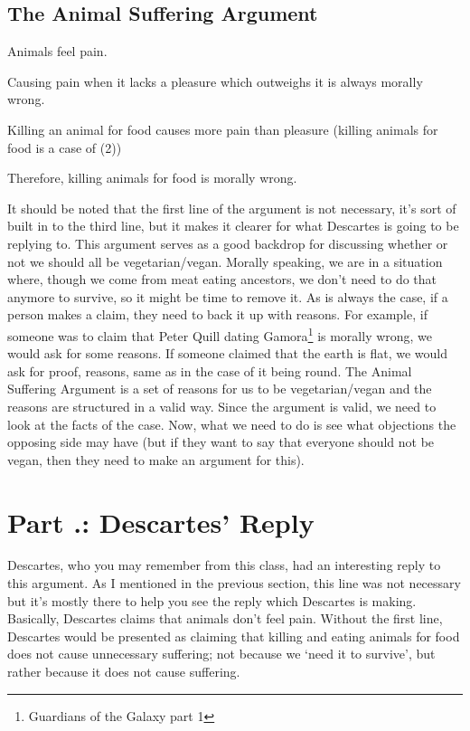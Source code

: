 \subsection{The Animal Suffering Argument} 
\begin{earg}
    \item[1] Animals feel pain.
    \item[2] Causing pain when it lacks a pleasure which outweighs it is always morally wrong.
    \item[3] Killing an animal for food causes more pain than pleasure (killing animals for food is a case of (2))
    \item[4] Therefore, killing animals for food is morally wrong.
\end{earg}

It should be noted that the first line of the argument is not necessary, it's sort of built in to the third line, but it makes it clearer for what Descartes is going to be replying to. This argument serves as a good backdrop for discussing whether or not we should all be vegetarian/vegan. Morally speaking, we are in a situation where, though we come from meat eating ancestors, we don't need to do that anymore to survive, so it might be time to remove it.  As is always the case, if a person makes a claim, they need to back it up with reasons. For example, if someone was to claim that Peter Quill dating Gamora\footnote{Guardians of the Galaxy part 1} is morally wrong, we would ask for some reasons. If someone claimed that the earth is flat, we would ask for proof, reasons, same as in the case of it being round.  The Animal Suffering Argument is a set of reasons for us to be vegetarian/vegan and the reasons are structured in a valid way. Since the argument is valid, we need to look at the facts of the case. Now, what we need to do is see what objections the opposing side may have (but if they want to say that everyone should not be vegan, then they need to make an argument for this).

\section{Part \thechapcount.\theseccount: Descartes' Reply}

Descartes, who you may remember from this class, had an interesting reply to this argument. As I mentioned in the previous section, this line was not necessary but it's mostly there to help you see the reply which Descartes is making. Basically, Descartes claims that animals don't feel pain. Without the first line, Descartes would be presented as claiming that killing and eating animals for food does not cause unnecessary suffering; not because we `need it to survive', but rather because it does not cause suffering.  

